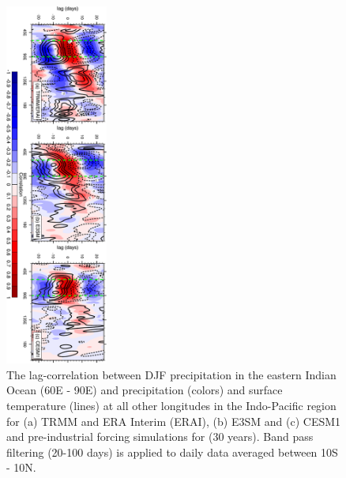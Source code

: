 \documentclass[draft,ms]{AGUTeX}
\begin{document}
\begin{article}
\begin{figure}[t]
  \begin{center}
   \noindent\includegraphics[width=0.3\textwidth,angle=90.]{./figs/f_lagcorr_ts_djf.pdf}
  \end{center}
  \caption{The lag-correlation between DJF precipitation in the eastern Indian Ocean (60\deg E - 90\deg E) and precipitation (colors) and surface temperature (lines) at all other longitudes in the Indo-Pacific region for (a) TRMM and ERA Interim (ERAI), (b) E3SM and (c) CESM1 and pre-industrial forcing simulations for (30 years). Band pass filtering (20-100 days) is applied to daily data averaged between 10\deg S - 10\deg N.} 
\label{f_lagcorr_ts_djf}
\end{figure}


\end{article}
\end{document}
